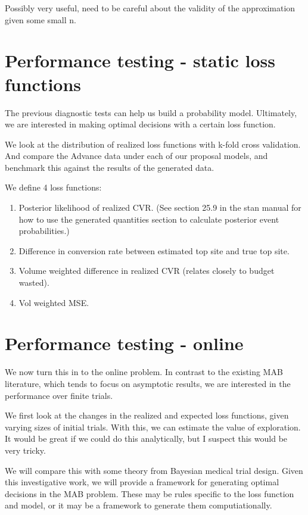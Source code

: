 \documentclass[12pt]{article}
\begin{document}
Possibly very useful, need to be careful about the validity of the approximation given some small n.

\section{ Performance testing - static loss functions }

The previous diagnostic tests can help us build a probability model. Ultimately, we are interested in making optimal decisions with a certain loss function. 

We look at the distribution of realized loss functions with k-fold cross validation. And compare the Advance data under each of our proposal models, and benchmark this against the results of the generated data.

We define 4 loss functions:
\begin{enumerate}
	\item Posterior likelihood of realized CVR. (See section 25.9 in the stan manual for how to use the generated quantities section to calculate posterior event probabilities.)
	\item Difference in conversion rate between estimated top site and true top site.
	\item Volume weighted difference in realized CVR (relates closely to budget wasted). 
	\item Vol weighted MSE.
\end{enumerate}

\section{ Performance testing - online }

We now turn this in to the online problem. In contrast to the existing MAB literature, which tends to focus on asymptotic results, we are interested in the performance over finite trials.

We first look at the changes in the realized and expected loss functions, given varying sizes of initial trials. With this, we can estimate the value of exploration. It would be great if we could do this analytically, but I suspect this would be very tricky. 

We will compare this with some theory from Bayesian medical trial design. Given this investigative work, we will provide a framework for generating optimal decisions in the MAB problem. These may be rules specific to the loss function and model, or it may be a framework to generate them computiationally.
\end{document}
